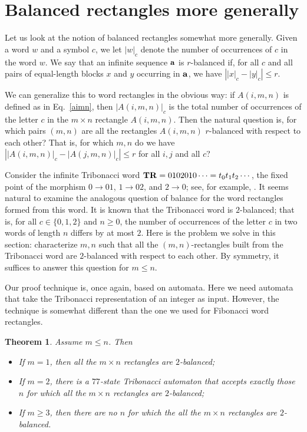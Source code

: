 \documentclass[final]{dmtcs-episciences}
\theoremstyle{plain}
\newtheorem{theorem}{Theorem}
\theoremstyle{remark}
\begin{document}
\section{Balanced rectangles more generally}

Let us look at the notion of balanced rectangles somewhat more generally.   Given a word
$w$ and a symbol $c$, we let
$|w|_c$ denote the number of occurrences of $c$ in the word $w$.   We say that an infinite sequence $\bf a$ is $r$-balanced if, for all $c$ and all pairs of equal-length blocks $x$ and $y$ occurring in $\bf a$, we have
$\left| |x|_c - |y|_c \right| \leq r$.

We can generalize this to word rectangles in the obvious way:  if $A(i,m,n)$ is defined as in
Eq.~\eqref{aimn}, then 
$|A(i,m,n)|_c$ is the total number of occurrences of the letter $c$ in the $m \times n$ rectangle $A(i,m,n)$.  Then the natural question is,
for which pairs $(m,n)$ are all the rectangles $A(i,m,n)$ $r$-balanced with respect to each other? That is, for which $m,n$ do we have
$\left| |A(i,m,n)|_c - |A(j,m,n)|_c \right| \leq r$
for all $i, j$ and all $c$?


Consider the infinite Tribonacci word ${\bf TR} = 0102010\cdots = t_0 t_1 t_2 \cdots$, the fixed point of the morphism
$0 \rightarrow 01$, $1 \rightarrow 02$, and $2 \rightarrow 0$; see, for example, \cite{Berstel:2002}.  It seems natural to examine the analogous question of balance for the word rectangles formed from this word.
It is known \cite[see][]{Richomme&Saari&Zamboni:2010} that the Tribonacci word is $2$-balanced; that is, for all $c \in \{0,1,2\}$ and $n \geq 0$, the number of occurrences of the letter $c$ in two words of length $n$ differs by at most $2$.  
Here is the problem we solve in this section:  characterize  $m,n$ such that all the $(m,n)$-rectangles built from the Tribonacci word are $2$-balanced with respect to each other.  By symmetry, it suffices to answer this question for $m \leq n$.

Our proof technique is, once again, based on automata.  Here we need automata that take the Tribonacci representation \citep{Carlitz&Scoville&Hoggatt:1972} of an integer as input.  However, the technique is somewhat different than the one we used for Fibonacci word rectangles.
\begin{theorem}
Assume $m \leq n$. Then
\begin{itemize}
    \item[(a)] If $m = 1$, then all the $m \times n$ rectangles are $2$-balanced;
    \item[(b)] If $m = 2$, there is a $77$-state Tribonacci automaton that accepts exactly those $n$ for which all the $m \times n$ rectangles are $2$-balanced;
    \item[(c)] If $m \geq 3$, then there are no $n$ for which the all the $m \times n$ rectangles are $2$-balanced.
\end{itemize}
\end{theorem}
\end{document}
